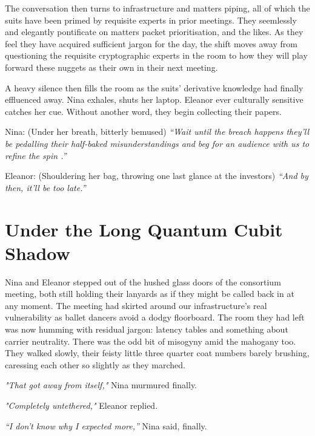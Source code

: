 \smallskip

The conversation then  turns to infrastructure and matters piping, all of which the suits have been primed by requisite experts in prior meetings. They seemlessly and elegantly pontificate on matters packet prioritisation, and the likes. As they feel they have acquired sufficient jargon for the day, the shift moves away from questioning the requisite cryptographic experts in the room to how they will play forward these nuggets as their own in their next meeting.

\smallskip

\noindent A heavy silence then fills the room as the suits' derivative knowledge had finally effluenced away. Nina exhales, shuts her laptop. Eleanor ever culturally sensitive catches her cue. Without another word, they begin collecting their papers.

\smallskip

Nina: (Under her breath, bitterly bemused) \textit{“Wait until the breach happens they’ll be pedalling their half-baked misunderstandings and beg for an audience with us to refine the spin .”}

\smallskip

Eleanor: (Shouldering her bag, throwing one last glance at the investors) \textit{“And by then, it’ll be too late.”}

\newpage

\noindent
\section*{Under the Long Quantum Cubit Shadow}

Nina and Eleanor stepped out of the hushed glass doors of the consortium meeting, both still holding their lanyards as if they might be called back in at any moment. The meeting had skirted around our infrastructure's real vulnerability as ballet dancers avoid a dodgy floorboard. The room they had left was now humming with residual jargon: latency tables and something about carrier neutrality. There was the odd bit of misogyny amid the mahogany too. They walked slowly, their feisty little three quarter coat numbers barely brushing, caressing each other so slightly as they marched. 

\smallskip


\textit{"That got away from itself,"} Nina murmured finally.

\textit{"Completely untethered,"} Eleanor replied. 

\textit{``I don't know why I expected more,''} Nina said, finally.

